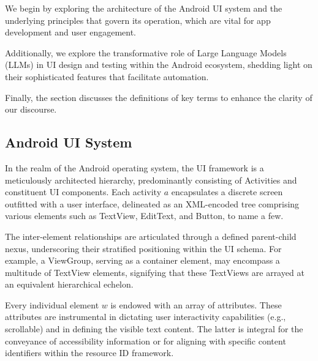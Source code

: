 \documentclass[conference]{IEEEtran}
\begin{document}
We begin by exploring the architecture of the Android UI system and the underlying principles that govern its operation, which are vital for app development and user engagement.

Additionally, we explore the transformative role of Large Language Models (LLMs) in UI design and testing within the Android ecosystem, shedding light on their sophisticated features that facilitate automation.

Finally, the section discusses the definitions of key terms to enhance the clarity of our discourse.

\subsection{Android UI System}
In the realm of the Android operating system, the UI framework \cite{android_layouts_in_views} is a meticulously architected hierarchy, predominantly consisting of Activities and constituent UI components. Each activity $a$ encapsulates a discrete screen outfitted with a user interface, delineated as an XML-encoded tree comprising various elements such as TextView, EditText, and Button, to name a few.

The inter-element relationships are articulated through a defined parent-child nexus, underscoring their stratified positioning within the UI schema. For example, a ViewGroup, serving as a container element, may encompass a multitude of TextView elements, signifying that these TextViews are arrayed at an equivalent hierarchical echelon.

Every individual element $w$ is endowed with an array of attributes. These attributes are instrumental in dictating user interactivity capabilities (e.g., scrollable) and in defining the visible text content. The latter is integral for the conveyance of accessibility information or for aligning with specific content identifiers within the resource ID framework.
\end{document}
